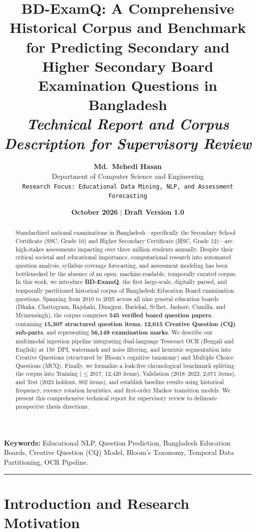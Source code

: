 \documentclass[11pt,a4paper]{article}
\title{\Large \textbf{BD-ExamQ: A Comprehensive Historical Corpus and Benchmark for Predicting Secondary and Higher Secondary Board Examination Questions in Bangladesh}\\
\vspace{0.4em}\large \textsl{Technical Report and Corpus Description for Supervisory Review}}
\author{
    \textbf{Md.\ Mehedi Hasan}\\
    Department of Computer Science and Engineering\\
    \texttt{Research Focus: Educational Data Mining, NLP, and Assessment Forecasting}
}
\date{\textbf{October 2026} \quad $\vert$ \quad \textbf{Draft Version 1.0}}
\begin{document}
\maketitle

\begin{abstract}
Standardized national examinations in Bangladesh---specifically the Secondary School Certificate (SSC, Grade 10) and Higher Secondary Certificate (HSC, Grade 12)---are high-stakes assessments impacting over three million students annually. Despite their critical societal and educational importance, computational research into automated question analysis, syllabus coverage forecasting, and assessment modeling has been bottlenecked by the absence of an open, machine-readable, temporally curated corpus. In this work, we introduce \textbf{BD-ExamQ}, the first large-scale, digitally parsed, and temporally partitioned historical corpus of Bangladesh Education Board examination questions. Spanning from 2010 to 2025 across all nine general education boards (Dhaka, Chattogram, Rajshahi, Dinajpur, Barishal, Sylhet, Jashore, Cumilla, and Mymensingh), the corpus comprises \textbf{545 verified board question papers}, containing \textbf{15,307 structured question items}, \textbf{12,015 Creative Question (CQ) sub-parts}, and representing \textbf{56,149 examination marks}. We describe our multimodal ingestion pipeline integrating dual-language Tesseract OCR (Bengali and English) at 150~DPI, watermark and noise filtering, and heuristic segmentation into Creative Questions (structured by Bloom's cognitive taxonomy) and Multiple Choice Questions (MCQ). Finally, we formalize a leak-free chronological benchmark splitting the corpus into Training ($\le 2017$, 12,420 items), Validation (2018--2022, 2,071 items), and Test (2023 holdout, 802 items), and establish baseline results using historical frequency, recency rotation heuristics, and first-order Markov transition models. We present this comprehensive technical report for supervisory review to delineate prospective thesis directions.
\end{abstract}

\vspace{1em}
\noindent\textbf{Keywords:} Educational NLP, Question Prediction, Bangladesh Education Boards, Creative Question (CQ) Model, Bloom's Taxonomy, Temporal Data Partitioning, OCR Pipeline.

\vspace{1em}
\hrule
\vspace{1.5em}

\section{Introduction and Research Motivation}
\label{sec:intro}
\end{document}
